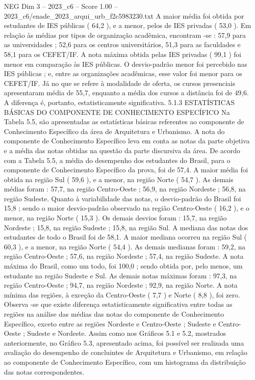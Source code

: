 \begin{textsample}{NEG Dim 3 – 2023\_c6 – Score 1.00 – 2023\_c6/enade\_2023\_arqui\_urb\_f2c5983230.txt}
A maior média foi obtida por estudantes de IES públicas ( 64,2 ), e a menor, pelos de IES privadas ( 53,0 ).
Em relação às médias por tipos de organização acadêmica, encontram -se : 57,9 para as universidades ; 52,6 para os centros universitários, 51,3 para as faculdades e 58,1 para os CEFET/IF.
A nota máxima obtida pelas IES privadas ( 99,1 ) foi menor em comparação às IES públicas.
O desvio-padrão menor foi percebido nas IES públicas ; e, entre as organizações acadêmicas, esse valor foi menor para os CEFET/IF.
Já no que se refere à modalidade de oferta, os cursos presenciais apresentaram média de 55,7, enquanto a média dos cursos a distância foi de 49,6.
A diferença é, portanto, estatisticamente significativa. 5.1.3 ESTATÍSTICAS BÁSICAS DO COMPONENTE DE CONHECIMENTO ESPECÍFICO Na Tabela 5.5, são apresentadas as estatísticas básicas referentes ao componente de Conhecimento Específico da área de Arquitetura e Urbanismo.
A nota do componente de Conhecimento Específico leva em conta as notas da parte objetiva e a média das notas obtidas na questão da parte discursiva da área.
De acordo com a Tabela 5.5, a média do desempenho dos estudantes do Brasil, para o componente de Conhecimento Específico da prova, foi de 57,4.
A maior média foi obtida na região Sul ( 59,6 ), e a menor, na região Norte ( 54,7 ).
As demais médias foram : 57,7, na região Centro-Oeste ; 56,9, na região Nordeste ; 56,8, na região Sudeste.
Quanto à variabilidade das notas, o desvio-padrão do Brasil foi 15,8 ; sendo o maior desvio-padrão observado na região Centro-Oeste ( 16,2 ), e o menor, na região Norte ( 15,3 ).
Os demais desvios foram : 15,7, na região Nordeste ; 15,8, na região Sudeste ; 15,8, na região Sul.
A mediana das notas dos estudantes de todo o Brasil foi de 58,1.
A maior mediana ocorreu na região Sul ( 60,3 ), e a menor, na região Norte ( 54,4 ).
As demais medianas foram : 59,2, na região Centro-Oeste ; 57,6, na região Nordeste ; 57,4, na região Sudeste.
A nota máxima do Brasil, como um todo, foi 100,0 ; sendo obtida por, pelo menos, um estudante na região Sudeste e Sul.
As demais notas máximas foram : 97,3, na região Centro-Oeste ; 94,7, na região Nordeste ; 92,9, na região Norte.
A nota mínima das regiões, à exceção da Centro-Oeste ( 7,7 ) e Norte ( 8,8 ), foi zero.
Observa -se que existe diferença estatisticamente significativa entre todas as regiões na análise das médias das notas do componente de Conhecimento Específico, exceto entre as regiões Nordeste e Centro-Oeste ; Sudeste e Centro-Oeste ; Sudeste e Nordeste.
Assim como nos Gráficos 5.1 e 5.2, mostrados anteriormente, no Gráfico 5.3, apresentado acima, foi possível ser realizada uma avaliação do desempenho de concluintes de Arquitetura e Urbanismo, em relação ao componente de Conhecimento Específico, com um histograma da distribuição das notas correspondentes.

\end{textsample}
